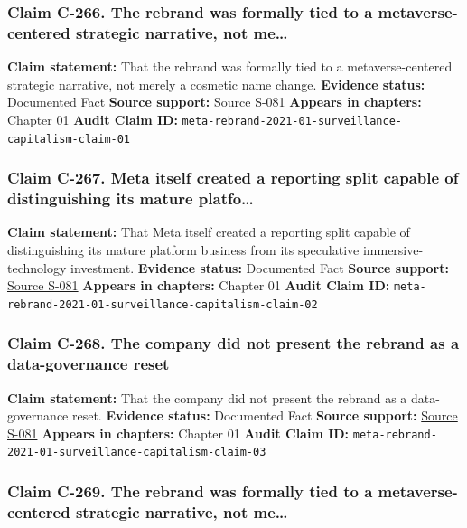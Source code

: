 \documentclass[
  american,
  11pt,
  letterpaper,
]{article}
\begin{document}
\subsubsection{Claim C-266. The rebrand was formally tied to a
metaverse-centered strategic narrative, not
me\ldots{}}\label{claim-c-266-the-rebrand-was-formally-tied-to-a-metaverse-centered-strategic-narrative-not-me}

\textbf{Claim statement:} That the rebrand was formally tied to a
metaverse-centered strategic narrative, not merely a cosmetic name
change. \textbf{Evidence status:} Documented Fact \textbf{Source
support:}
\hyperref[source-s-081-the-facebook-company-is-now-meta]{Source S-081}
\textbf{Appears in chapters:} Chapter 01 \textbf{Audit Claim ID:}
\texttt{meta-rebrand-2021-01-surveillance-capitalism-claim-01}

\subsubsection{Claim C-267. Meta itself created a reporting split
capable of distinguishing its mature
platfo\ldots{}}\label{claim-c-267-meta-itself-created-a-reporting-split-capable-of-distinguishing-its-mature-platfo}

\textbf{Claim statement:} That Meta itself created a reporting split
capable of distinguishing its mature platform business from its
speculative immersive-technology investment. \textbf{Evidence status:}
Documented Fact \textbf{Source support:}
\hyperref[source-s-081-the-facebook-company-is-now-meta]{Source S-081}
\textbf{Appears in chapters:} Chapter 01 \textbf{Audit Claim ID:}
\texttt{meta-rebrand-2021-01-surveillance-capitalism-claim-02}

\subsubsection{Claim C-268. The company did not present the rebrand as a
data-governance
reset}\label{claim-c-268-the-company-did-not-present-the-rebrand-as-a-data-governance-reset}

\textbf{Claim statement:} That the company did not present the rebrand
as a data-governance reset. \textbf{Evidence status:} Documented Fact
\textbf{Source support:}
\hyperref[source-s-081-the-facebook-company-is-now-meta]{Source S-081}
\textbf{Appears in chapters:} Chapter 01 \textbf{Audit Claim ID:}
\texttt{meta-rebrand-2021-01-surveillance-capitalism-claim-03}

\subsubsection{Claim C-269. The rebrand was formally tied to a
metaverse-centered strategic narrative, not
me\ldots{}}\label{claim-c-269-the-rebrand-was-formally-tied-to-a-metaverse-centered-strategic-narrative-not-me}
\end{document}

